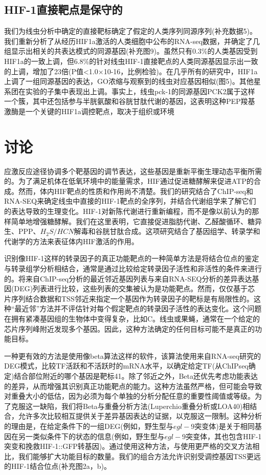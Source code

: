 \documentclass{ctexart}
\begin{document}
    \subsection{HIF-1直接靶点是保守的}

        我们为线虫分析中确定的直接靶标确定了假定的人类序列同源序列(补充数据5)。我们重新分析了从经历HIF1a激活的人类细胞中公布的RNA-seq数据，并确定了几组显示出相关的共表达模式的同源基因(补充图9)。虽然只有0.3\%的人类基因受到HIF1a的一致上调，但6.8\%的针对线虫HIF-1直接靶点的人类同源基因显示出一致的上调，增加了23倍(P值<1.0×10-16，比例检验)。在几乎所有的研究中，HIF1a上调了一组同源基因的表达，GO浓缩与观察到的线虫对应基因相似(图5)。其他星系团在实验的子集中表现出上调。事实上，线虫pck-1的同源基因PCK2属于这样一个簇，其中还包括参与半胱氨酸和谷胱甘肽代谢的基因，这表明这种PEP羧基激酶是一个关键的HIF1a调控靶点，取决于组织或环境

    \section{讨论}

        应激反应途径协调多个靶基因的调节表达，这些基因是重新平衡生理动态平衡所需的。为了满足机体在低氧环境中的能量需求，HIF通过促进糖酵解来促进ATP的合成。然而，体内HIF靶点的性质和作用尚不清楚。我们的研究结合了ChIP-seq和RNA-SEQ来确定线虫中直接的HIF-1靶点的全序列，并结合代谢组学来了解它们的表达导致的生理变化。HIF-1对新陈代谢进行重新编程，而不是像以前认为的那样简单地增强糖酵解。我们在这里表明，它直接促进脂肪代谢、乙醛酸循环、糖异生、PPP、$H_{2}S/HCN$解毒和谷胱甘肽合成。这项研究结合了基因组学、转录学和代谢学的方法来表征体内HIF激活的作用。

        识别像HIF-1这样的转录因子的真正功能靶点的一种简单方法是将结合位点的鉴定与转录组学分析相结合，通常是通过比较给定转录因子活性和非活性的条件来进行的。将来自ChIP-seq分析的最近邻近基因列表与来自RNA-SEQ分析的差异表达基因(DEG)列表进行比较，这些列表的交集被认为是功能靶点。然而，仅仅基于芯片序列结合数据和TSS邻近来指定一个基因作为转录因子的靶标是有局限性的。这种“最近邻”方法并不评估针对每个假定靶点的转录因子活性的表达变化。这个问题在拥有紧凑基因组的生物体中变得复杂，比如C。线虫或果蝇，通常在一个给定的芯片序列峰附近发现多个基因。因此，这种方法确定的任何目标可能不是真正的功能目标。

        一种更有效的方法是使用像beta算法这样的软件，该算法使用来自RNA-seq研究的DEG模式，比较TF活跃和不活跃时的mRNA水平，以确定给定TF(从ChIPseq确定)结合部位附近的哪个基因是靶标41。除了邻近之外，Beta还优先考虑功能表达的差异，从而增强其识别真正功能靶点的能力。这种方法虽然严格，但可能会导致对重叠大小的低估，因为必须为每个单独的分析分配任意的重要性阈值或等级。为了克服这一缺陷，我们将Beta与重叠分析方法(Luperchio重叠分析或LOA40)相结合，允许多次比较相互提供关于差异基因表达的证据，以克服这一限制。这种分析的理由是，在给定条件下的一组DEG(例如，野生型与$egl-9$突变体)是关于相同基因在另一类似条件下的状态的信息(例如，野生型与$egl-9$突变体，其也包含HIF-1突变和挽救HIF-1::GFP转基因)。通过使用这种方法，与使用更严格的交叉方法相比，我们能够扩大功能目标的数量。我们的组合方法允许识别受调控基因TSS更远的HIF-1结合位点(补充图2a，b)。
        
\end{document}

